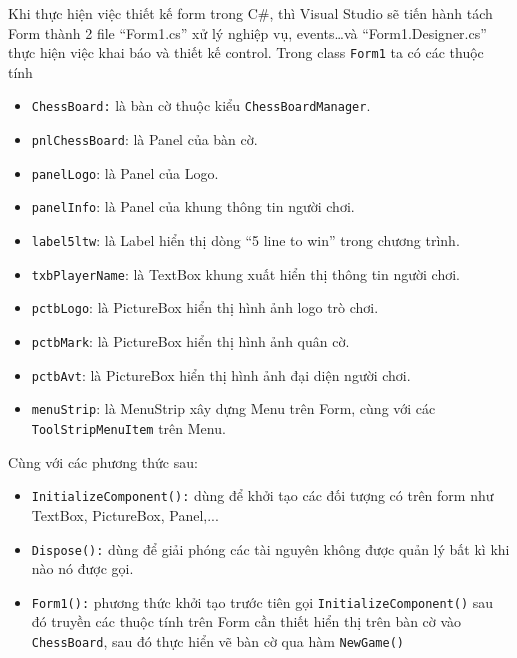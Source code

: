 Khi thực hiện việc thiết kế form trong C\#, thì Visual Studio sẽ tiến hành tách Form thành 2 file  ``Form1.cs'' xử lý nghiệp vụ, events…và ``Form1.Designer.cs'' thực hiện việc khai báo và thiết kế control. Trong class \texttt{Form1} ta có các thuộc tính
\begin{itemize}
	\item \texttt{ChessBoard:} là bàn cờ thuộc kiểu \texttt{ChessBoardManager}.
	\item \texttt{pnlChessBoard}: là Panel của bàn cờ.
	\item \texttt{panelLogo}: là Panel của Logo.
	\item \texttt{panelInfo}: là Panel của khung thông tin người chơi.
	\item \texttt{label5ltw}: là Label hiển thị dòng ``5 line to win'' trong chương trình.
	\item \texttt{txbPlayerName}: là TextBox khung xuất hiển thị thông tin người chơi.
	\item \texttt{pctbLogo}: là PictureBox hiển thị hình ảnh logo trò chơi.
	\item \texttt{pctbMark}: là PictureBox hiển thị hình ảnh quân cờ.
	\item \texttt{pctbAvt}: là PictureBox hiển thị hình ảnh đại diện người chơi.
	\item \texttt{menuStrip}: là MenuStrip xây dựng Menu trên Form, cùng với các \texttt{ToolStripMenuItem} trên Menu.
\end{itemize}

Cùng với các phương thức sau:
\begin{itemize}
	\item \texttt{InitializeComponent():} dùng để khởi tạo các đối tượng có trên form như TextBox, PictureBox, Panel,...

	\item \texttt{Dispose():} dùng để giải phóng các tài nguyên không được quản lý bất kì khi nào nó được gọi.
	
	\item \texttt{Form1():} phương thức khởi tạo trước tiên gọi \texttt{InitializeComponent()} sau đó truyền các thuộc tính trên Form cần thiết hiển thị trên bàn cờ vào \texttt{ChessBoard}, sau đó thực hiển vẽ bàn cờ qua hàm \texttt{NewGame()}
\end{itemize}
